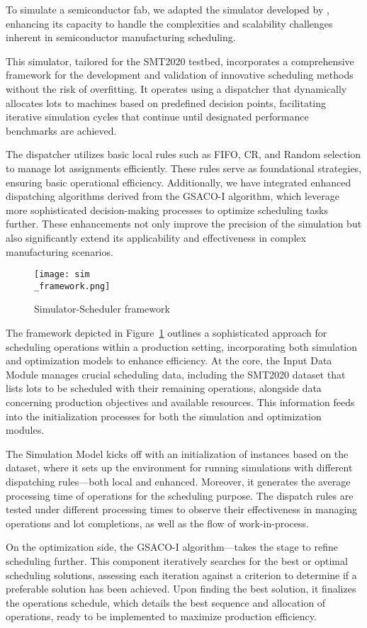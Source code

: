 To simulate a semiconductor fab, we adapted the simulator developed by \cite{Kovács2022}, enhancing its capacity to handle the complexities and scalability challenges inherent in semiconductor manufacturing scheduling.

This simulator, tailored for the SMT2020 testbed, incorporates a comprehensive framework for the development and validation of innovative scheduling methods without the risk of overfitting. It operates using a dispatcher that dynamically allocates lots to machines based on predefined decision points, facilitating iterative simulation cycles that continue until designated performance benchmarks are achieved.

The dispatcher utilizes basic local rules such as FIFO, CR, and Random selection to manage lot assignments efficiently. These rules serve as foundational strategies, ensuring basic operational efficiency. Additionally, we have integrated enhanced dispatching algorithms derived from the GSACO-I algorithm, which leverage more sophisticated decision-making processes to optimize scheduling tasks further. These enhancements not only improve the precision of the simulation but also significantly extend its applicability and effectiveness in complex manufacturing scenarios.

\begin{figure}[t]
	\texttt{[image: sim\\\_framework.png]}
	\caption{Simulator-Scheduler framework}
	\label{fig:ss}
\end{figure}

The framework depicted in Figure~\ref{fig:ss} outlines a sophisticated approach for scheduling operations within a production setting, incorporating both simulation and optimization models to enhance efficiency. At the core, the Input Data Module manages crucial scheduling data, including the SMT2020 dataset that lists lots to be scheduled with their remaining operations, alongside data concerning production objectives and available resources. This information feeds into the initialization processes for both the simulation and optimization modules.

The Simulation Model kicks off with an initialization of instances based on the dataset, where it sets up the environment for running simulations with different dispatching rules—both local and enhanced. Moreover, it generates the average processing time of operations for the scheduling purpose.
The dispatch rules are tested under different processing times to observe their effectiveness in managing operations and lot completions, as well as the flow of work-in-process.

On the optimization side, the GSACO-I algorithm—takes the stage to refine scheduling further. This component iteratively searches for the best or optimal scheduling solutions, assessing each iteration against a criterion to determine if a preferable solution has been achieved. Upon finding the best solution, it finalizes the operations schedule, which details the best sequence and allocation of operations, ready to be implemented to maximize production efficiency.